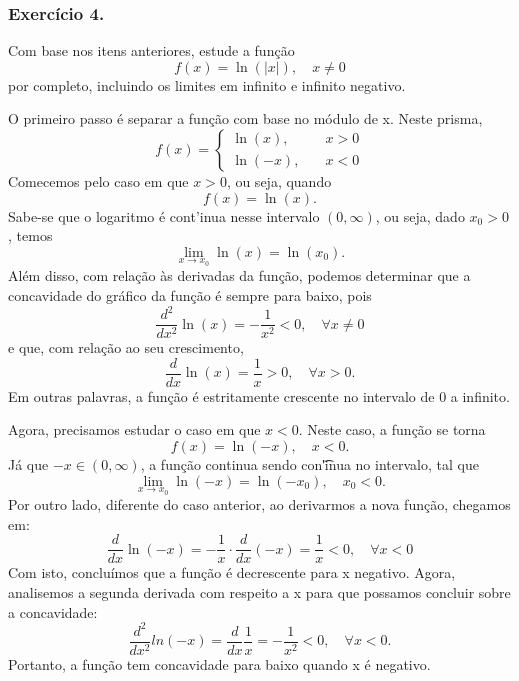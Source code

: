 \subsubsection{Exerc\'icio 4.}
Com base nos itens anteriores, estude a fun\c c\~ao
\[
	f(x) = \ln(|x|), \quad x\neq{0}
\]
por completo, incluindo os limites em infinito e infinito negativo.

\begin{proof*}
	O primeiro passo \'e separar a fun\c c\~ao com base no m\'odulo de x. Neste
	prisma,
	\[
		f(x) = \left\{
		\begin{array}{ll}
			\ln(x), \quad  & x > 0 \\
			\ln(-x), \quad & x < 0
		\end{array}\right.
	\]
	Comecemos pelo caso em que $x > 0$, ou seja, quando
	\[
		f(x) = \ln(x).
	\]
	Sabe-se que o logaritmo \'e cont'inua nesse intervalo $(0, \infty)$, ou seja,
	dado $x_{0}> 0$, temos
	\[
		\lim_{x\to{x_0}}\ln(x) = \ln(x_{0}).
	\]
	Al\'em disso, com rela\c c\~ao \`as derivadas da fun\c c\~ao, podemos
	determinar que a concavidade do gr\'afico da fun\c c\~ao \'e sempre para baixo,
	pois
	\[
		\frac{d^{2}}{dx^{2}}\ln(x) = -\frac{1}{x^{2}}< 0, \quad \forall x\neq0
	\]
	e que, com rela\c c\~ao ao seu crescimento,
	\[
		\frac{d}{dx}\ln(x) = \frac{1}{x}> 0, \quad \forall x > 0.
	\]
	Em outras palavras, a fun\c c\~ao \'e estritamente crescente no intervalo de 0
	a infinito.

	Agora, precisamos estudar o caso em que $x < 0$. Neste caso, a fun\c c\~ao se torna
	\[
		f
		(
		x
		)
		=
		\ln
		(
		-
		x
		)
		,
		\quad
		x
		<
		0
		.
	\]
	J\'a que $-x\in(0, \infty)$, a fun\c c\~ao continua sendo con\t'inua no
	intervalo, tal que
	\[
		\lim_{x\to{x_0}}\ln(-x) = \ln(-x_{0}), \quad x_{0}< 0.
	\]
	Por outro lado, diferente do caso anterior, ao derivarmos a nova fun\c c\~ao, chegamos
	em:
	\[
		\frac{d}{dx}\ln(-x) = -\frac{1}{x}\cdot\frac{d}{dx}(-x) = \frac{1}{x}< 0, \quad \forall x < 0
	\]
	Com isto, conclu\'imos que a fun\c c\~ao \'e decrescente para x negativo.
	Agora, analisemos a segunda derivada com respeito a x para que possamos concluir
	sobre a concavidade:
	\[
		\frac{d^{2}}{d x^{2}}ln(-x) = \frac{d}{dx}\frac{1}{x}= -\frac{1}{x^{2}}< 0, \quad \forall x < 0.
	\]
	Portanto, a fun\c c\~ao tem concavidade para baixo quando x \'e negativo.
\end{proof*}

